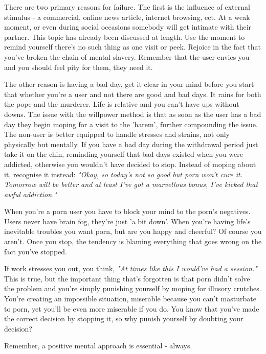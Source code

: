 \documentclass[easypeasy.tex]{subfiles}
\begin{document}
There are two primary reasons for failure. The first is the influence of external stimulus - a commercial, online news article, internet browsing, ect. At a weak moment, or even during social occasions somebody will get intimate with their partner. This topic has already been discussed at length. Use the moment to remind yourself there's no such thing as one visit or peek. Rejoice in the fact that you've broken the chain of mental slavery. Remember that the user envies you and you should feel pity for them, they need it.

The other reason is having a bad day, get it clear in your mind before you start that whether you're a user and not there are good and bad days. It rains for both the pope and the murderer. Life is relative and you can't have ups without downs. The issue with the willpower method is that as soon as the user has a bad day they begin moping for a visit to the 'harem', further compounding the issue. The non-user is better equipped to handle stresses and strains, not only physically but mentally. If you have a bad day during the withdrawal period just take it on the chin, reminding yourself that bad days existed when you were addicted, otherwise you wouldn't have decided to stop. Instead of moping about it, recognise it instead: \textit{"Okay, so today's not so good but porn won't cure it. Tomorrow will be better and at least I've got a marvellous bonus, I've kicked that awful addiction."}

When you're a porn user you have to block your mind to the porn's negatives. Users never have brain fog, they're just 'a bit down'. When you're having life's inevitable troubles you want porn, but are you happy and cheerful? Of course you aren't. Once you stop, the tendency is blaming everything that goes wrong on the fact you've stopped.

If work stresses you out, you think, \textit{"At times like this I would've had a session."} This is true, but the important thing that's forgotten is that porn didn't solve the problem and you're simply punishing yourself by moping for illusory crutches. You're creating an impossible situation, miserable because you can't masturbate to porn, yet you'll be even more miserable if you do. You know that you've made the correct decision by stopping it, so why punish yourself by doubting your decision?

{\Large Remember, a positive mental approach is essential - always.}
\end{document}
